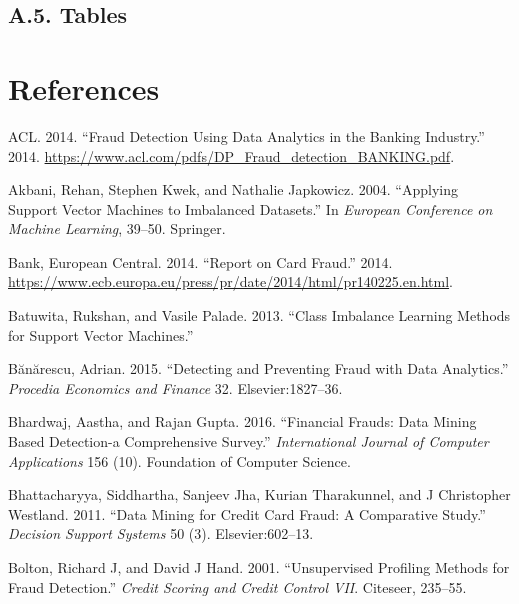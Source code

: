 \documentclass[12pt,]{article}
\begin{document}
\clearpage

\justify

\hypertarget{a.5.-tables}{%
\subsection{A.5. Tables}\label{a.5.-tables}}

\hypertarget{references}{%
\section*{References}\label{references}}

\hypertarget{refs}{}
\leavevmode\hypertarget{ref-fraudanalyticsacl}{}%
ACL. 2014. ``Fraud Detection Using Data Analytics in the Banking
Industry.'' 2014.
\url{https://www.acl.com/pdfs/DP_Fraud_detection_BANKING.pdf}.

\leavevmode\hypertarget{ref-akbani2004applying}{}%
Akbani, Rehan, Stephen Kwek, and Nathalie Japkowicz. 2004. ``Applying
Support Vector Machines to Imbalanced Datasets.'' In \emph{European
Conference on Machine Learning}, 39--50. Springer.

\leavevmode\hypertarget{ref-ecb_fraud}{}%
Bank, European Central. 2014. ``Report on Card Fraud.'' 2014.
\url{https://www.ecb.europa.eu/press/pr/date/2014/html/pr140225.en.html}.

\leavevmode\hypertarget{ref-batuwita2013class}{}%
Batuwita, Rukshan, and Vasile Palade. 2013. ``Class Imbalance Learning
Methods for Support Vector Machines.''

\leavevmode\hypertarget{ref-buanuarescu2015detecting}{}%
Bănărescu, Adrian. 2015. ``Detecting and Preventing Fraud with Data
Analytics.'' \emph{Procedia Economics and Finance} 32.
Elsevier:1827--36.

\leavevmode\hypertarget{ref-bhardwaj2016financial}{}%
Bhardwaj, Aastha, and Rajan Gupta. 2016. ``Financial Frauds: Data Mining
Based Detection-a Comprehensive Survey.'' \emph{International Journal of
Computer Applications} 156 (10). Foundation of Computer Science.

\leavevmode\hypertarget{ref-bhattacharyya2011data}{}%
Bhattacharyya, Siddhartha, Sanjeev Jha, Kurian Tharakunnel, and J
Christopher Westland. 2011. ``Data Mining for Credit Card Fraud: A
Comparative Study.'' \emph{Decision Support Systems} 50 (3).
Elsevier:602--13.

\leavevmode\hypertarget{ref-bolton2001unsupervised}{}%
Bolton, Richard J, and David J Hand. 2001. ``Unsupervised Profiling
Methods for Fraud Detection.'' \emph{Credit Scoring and Credit Control
VII}. Citeseer, 235--55.
\end{document}
